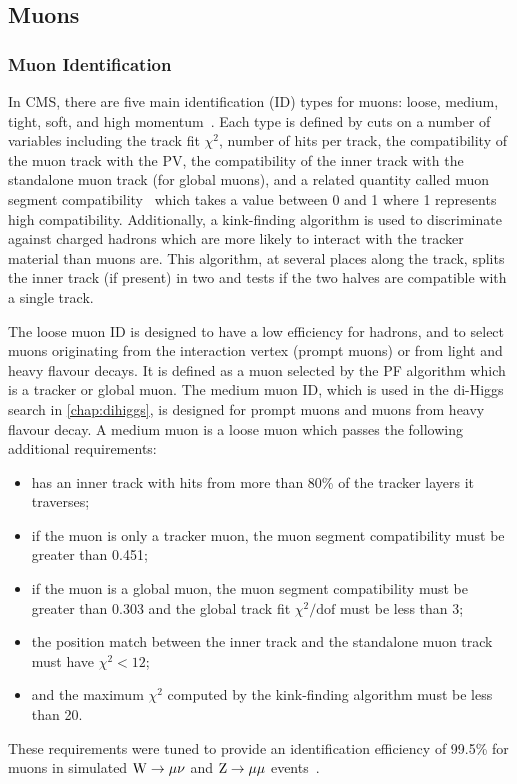 \subsection{Muons}\label{sec:muon_reco} 

\subsubsection{Muon Identification}

In CMS, there are five main identification (ID) types for muons: loose, medium, tight, soft, and high momentum~\cite{CMS:2018rym}. Each type is defined by cuts on a number of variables including the track fit $\chi^2$, number of hits per track, the compatibility of the muon track with the PV, the compatibility of the inner track with the standalone muon track (for global muons), and a related quantity called muon segment compatibility~\cite{CMS:2009fdy} which takes a value between 0 and 1 where 1 represents high compatibility. Additionally, a kink-finding algorithm is used to discriminate against charged hadrons which are more likely to interact with the tracker material than muons are. This algorithm, at several places along the track, splits the inner track (if present) in two and tests if the two halves are compatible with a single track.

The loose muon ID is designed to have a low efficiency for hadrons, and to select muons originating from the interaction vertex (prompt muons) or from light and heavy flavour decays. It is defined as a muon selected by the PF algorithm which is a tracker or global muon. The medium muon ID, which is used in the di-Higgs search in \cref{chap:dihiggs}, is designed for prompt muons and muons from heavy flavour decay. A medium muon is a loose muon which passes the following additional requirements: 
\begin{itemize}
  \setlength{\itemsep}{-3pt}
  \item has an inner track with hits from more than 80\% of the tracker layers it traverses;
  \item if the muon is only a tracker muon, the muon segment compatibility must be greater than 0.451;
  \item if the muon is a global muon, the muon segment compatibility must be greater than 0.303 and the global track fit $\chi^2/\text{dof}$ must be less than 3;
  \item the position match between the inner track and the standalone muon track must have $\chi^2 < 12$;
  \item and the maximum $\chi^2$ computed by the kink-finding algorithm must be less than 20.
\end{itemize}
These requirements were tuned to provide an identification efficiency of 99.5\% for muons in simulated $\mathrm{W}\to\mu\nu$ and $\mathrm{Z}\to\mu\mu$ events~\cite{CMS:2018rym}. 

